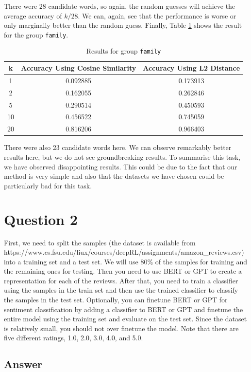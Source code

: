 \documentclass[
	12pt, %
]{../Template/fphw}
\begin{document}
There were 28 candidate words, so again, the random guesses will achieve the average accuracy of $k/28$. We can, again, see that the performance is worse or only marginally better than the random guess. Finally, Table \ref{tab: family} shows the result for the group \texttt{family}.

\begin{table}[H]
\centering
\begin{tabular}{ccc}
\hline
\textbf{k} & \textbf{Accuracy Using Cosine Similarity} & \textbf{Accuracy Using L2 Distance} \\
\hline
1 & 0.092885 & 0.173913 \\
2 & 0.162055 & 0.262846 \\
5 & 0.290514 & 0.450593 \\
10 & 0.456522 & 0.745059 \\
20 & 0.816206 & 0.966403 \\
\hline
\end{tabular}
\caption{Results for group \texttt{family}}
\label{tab: family}
\end{table}

There were also 23 candidate words here. We can observe remarkably better results here, but we do not see groundbreaking results. To summarise this task, we have observed disappointing results. This could be due to the fact that our method is very simple and also that the datasets we have chosen could be particularly bad for this task.

\section*{Question 2}

\begin{problem}
First, we need to split the samples (the dataset is available from
https://www.cs.fsu.edu/liux/courses/deepRL/assignments/amazon\_reviews.csv) into a training set and a test
set. We will use 80\% of the samples for training and the remaining ones for testing. Then you need to use
BERT or GPT to create a representation for each of the reviews. After that, you need to train a classifier using
the samples in the train set and then use the trained classifier to classify the samples in the test set. Optionally,
you can finetune BERT or GPT for sentiment classification by adding a classifier to BERT or GPT and
finetune the entire model using the training set and evaluate on the test set. Since the dataset is relatively
small, you should not over finetune the model. Note that there are five different ratings, 1.0, 2.0, 3.0, 4.0, and
5.0.
\end{problem}


\subsection*{Answer}




\end{document}
